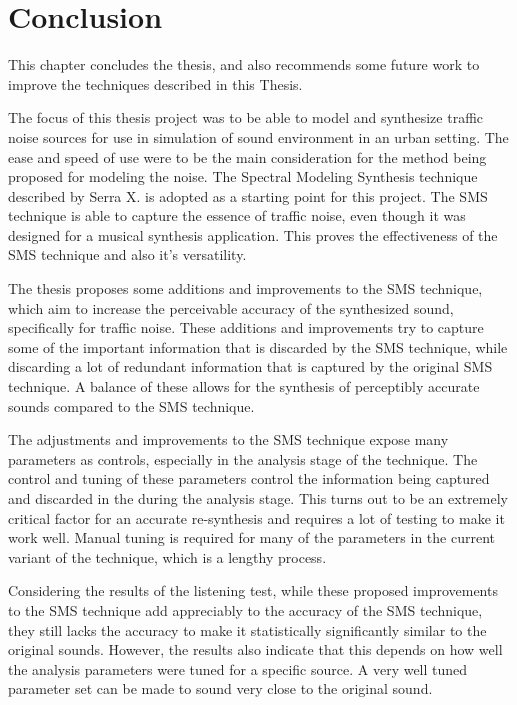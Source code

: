 \chapter{Conclusion}
\label{cha:conclusion}
This chapter concludes the thesis, and also recommends some future work to improve the techniques described in this Thesis.

The focus of this thesis project was to be able to model and synthesize traffic noise sources for use in simulation of sound environment in an urban setting. The ease and speed of use were to be the main consideration for the method being proposed for modeling the noise. The Spectral Modeling Synthesis technique described by Serra X. \cite{ref:sms} is adopted as a starting point for this project. The SMS technique is able to capture the essence of traffic noise, even though it was designed for a musical synthesis application. This proves the effectiveness of the SMS technique and also it's versatility. 

The thesis proposes some additions and improvements to the SMS technique, which aim to increase the perceivable accuracy of the synthesized sound, specifically for traffic noise. These additions and improvements try to capture some of the important information that is discarded by the SMS technique, while discarding a lot of redundant information that is captured by the original SMS technique. A balance of these allows for the synthesis of perceptibly accurate sounds compared to the SMS technique. 

The adjustments and improvements to the SMS technique expose many parameters as controls, especially in the analysis stage of the technique. The control and tuning of these parameters control the information being captured and discarded in the during the analysis stage. This turns out to be an extremely critical factor for an accurate re-synthesis and requires a lot of testing to make it work well. Manual tuning is required for many of the parameters in the current variant of the technique, which is a lengthy process.

Considering the results of the listening test, while these proposed improvements to the SMS technique add appreciably to the accuracy of the SMS technique, they still lacks the accuracy to make it statistically significantly similar to the original sounds. However, the results also indicate that this depends on how well the analysis parameters were tuned for a specific source. A very well tuned parameter set can be made to sound very close to the original sound.

